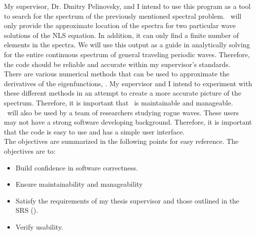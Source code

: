 \documentclass[12pt, titlepage]{article}
\begin{document}
	My supervisor, Dr$.$ Dmitry Pelinovsky, and I intend to use this program 
	as 
	a tool to search for the 
	 spectrum of the previously mentioned spectral problem. 
	\progname \
	will only provide the approximate 
	location of the spectra for two particular wave solutions of the NLS 
	equation. In addition, it 
	can only find a finite number of elements in the spectra. 	
	We will 
	use this output as a guide in analytically solving for the 
	entire continuous spectrum of general traveling periodic waves.  Therefore, 
	the 
	code should be reliable and accurate within my supervisor's standards. \\
	
	There are various numerical methods that can be used to approximate the 
	derivatives of the eigenfunctions, \cite{graspel}. My 
	supervisor and I intend to experiment with these different 
	methods in an attempt to create a more accurate picture of the spectrum. 
	Therefore, it is important that \progname \ is maintainable and 
	manageable. \\
	
	 \progname \ will also be used by a team of researchers studying rogue 
	 waves. These users may not have a strong software 
	 developing background. Therefore, it is important that the code is easy to 
	 use and has a simple user interface. \\
	 
	 The objectives are summarized in the following points for easy reference. 
	 The objectives are to:
	
\begin{itemize}
	\item Build confidence in software correctness.
	\item Ensure maintainability and manageability 
	\item Satisfy the requirements of my thesis supervisor and those outlined 
	in the SRS (\cite{SRS}). 
	\item Verify usability.	
\end{itemize}
\end{document}
